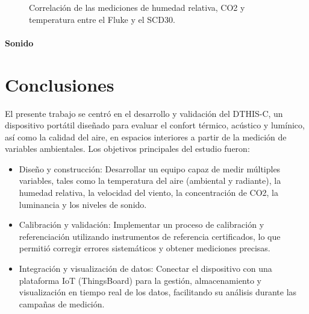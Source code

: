 \documentclass[
  letterpaper,
]{scrbook}
\begin{document}
\begin{figure}


\caption{\label{fig-ccalidad}Correlación de las mediciones de humedad
relativa, CO2 y temperatura entre el Fluke y el SCD30.}

\end{figure}%

\subsubsection{Sonido}\label{sonido-1}


\chapter{Conclusiones}\label{conclusiones}

El presente trabajo se centró en el desarrollo y validación del DTHIS-C,
un dispositivo portátil diseñado para evaluar el confort térmico,
acústico y lumínico, así como la calidad del aire, en espacios
interiores a partir de la medición de variables ambientales. Los
objetivos principales del estudio fueron:

\begin{itemize}
\item
  Diseño y construcción: Desarrollar un equipo capaz de medir múltiples
  variables, tales como la temperatura del aire (ambiental y radiante),
  la humedad relativa, la velocidad del viento, la concentración de CO2,
  la luminancia y los niveles de sonido.
\item
  Calibración y validación: Implementar un proceso de calibración y
  referenciación utilizando instrumentos de referencia certificados, lo
  que permitió corregir errores sistemáticos y obtener mediciones
  precisas.
\item
  Integración y visualización de datos: Conectar el dispositivo con una
  plataforma IoT (ThingsBoard) para la gestión, almacenamiento y
  visualización en tiempo real de los datos, facilitando su análisis
  durante las campañas de medición.
\end{itemize}
\end{document}
